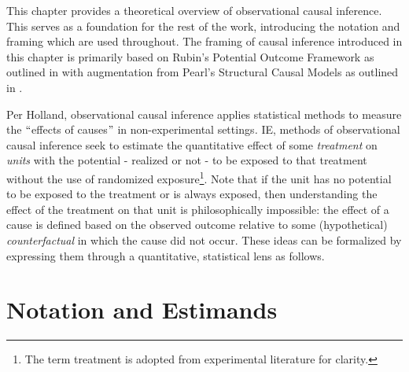 \documentclass[../main.tex]{subfiles}
\begin{document}
This chapter provides a theoretical overview of observational causal inference. This serves as a foundation for the rest of the work, introducing the notation and framing which are used throughout. The framing of causal inference introduced in this chapter is primarily based on Rubin’s Potential Outcome Framework as outlined in \textcite{Holland1986StatisticsInference} with augmentation from Pearl’s Structural Causal Models as outlined in \textcite{Pearl2009CausalOverview}.\par

\vspace{\baselineskip}
Per Holland, observational causal inference applies statistical methods to measure the $``$effects of causes\textit{$"$  }in non-experimental settings\textit{. }IE, methods of observational causal inference seek to estimate the quantitative effect of some \textit{treatment }on \textit{units} with the potential - realized or not - to be exposed to that treatment without the use of randomized exposure\footnote{ The term treatment is adopted from experimental literature for clarity. }. Note that if the unit has no potential to be exposed to the treatment or is always exposed, then understanding the effect of the treatment on that unit is philosophically impossible: the effect of a cause is defined based on the observed outcome relative to some (hypothetical) \textit{counterfactual }in which the cause did not occur. These ideas can be formalized by expressing them through a quantitative, statistical lens as follows.\par

\section{Notation and Estimands}
\end{document}
